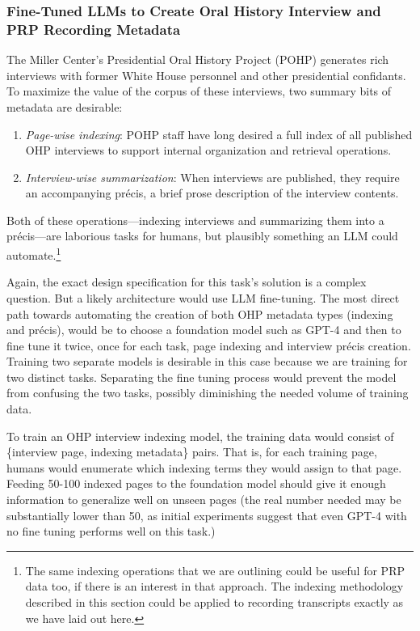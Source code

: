 \documentclass[12pt, oneside]{article}   	%
\begin{document}
\subsubsection{Fine-Tuned LLMs to Create Oral History Interview and PRP Recording Metadata}\label{section.applications.hard.pohp}
The Miller Center's Presidential Oral History Project (POHP) generates rich interviews with former White House personnel and other presidential confidants.  To maximize the value of the corpus of these interviews, two summary bits of metadata are desirable:
\begin{enumerate}
\item \emph{Page-wise indexing}: POHP staff have long desired a full index of all published OHP interviews to support internal organization and retrieval operations.
\item \emph{Interview-wise summarization}: When interviews are published, they require an accompanying pr\'{e}cis, a brief prose description of the interview contents.
\end{enumerate} 
Both of these operations---indexing interviews and summarizing them into a pr\'{e}cis---are laborious tasks for humans, but plausibly something an LLM could automate.\footnote{The same indexing operations that we are outlining could be useful for PRP data too, if there is an interest in that approach.  The indexing methodology described in this section could be applied to recording transcripts exactly as we have laid out here.}

Again, the exact design specification for this task's solution is a complex question.  But a likely architecture  would use LLM fine-tuning.   The most direct path towards automating the creation of both OHP metadata types (indexing and pr\'{e}cis), would be to choose a foundation model such as GPT-4 and then to fine tune it twice, once for each task, page indexing and interview pr\'{e}cis creation.  Training two separate models is desirable in this case because we are training for two distinct tasks.  Separating the fine tuning process would prevent the model from confusing the two tasks, possibly diminishing the needed volume of training data.  

To train an OHP interview indexing model, the training data would consist of \{interview page, indexing metadata\} pairs.  That is, for each training page, humans would enumerate which indexing terms they would assign to that page.  Feeding 50-100 indexed pages to the foundation model should give it enough information to generalize well on unseen pages (the real number needed may be substantially lower than 50, as initial experiments suggest that even GPT-4 with no fine tuning performs well on this task.)
\end{document}
